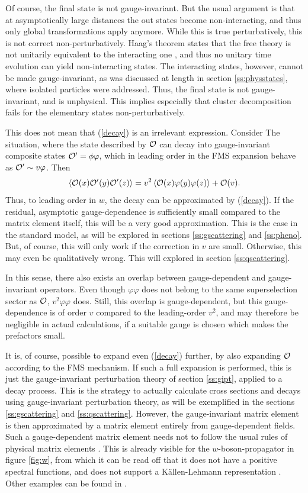 \documentclass[final,12pt]{article}
\newcommand*{\no}{\noindent}
\newcommand*{\be}{\begin{equation}}
\newcommand*{\ee}{\end{equation}}
\newcommand*{\pref}[1]{(\ref{#1})}
\newcommand*{\nn}{\nonumber}
\newcommand*{\1}{1\!\!\!\bot}
\newcommand*{\la}{\left\langle}
\newcommand*{\ra}{\right\rangle}
\newcommand*{\op}{{\cal O}}
\begin{document}
Of course, the final state is not gauge-invariant. But the usual argument is that at asymptotically large distances the out states become non-interacting, and thus only global transformations apply anymore. While this is true perturbatively, this is not correct non-perturbatively. Haag's theorem states that the free theory is not unitarily equivalent to the interacting one \cite{Haag:1992hx}, and thus no unitary time evolution can yield non-interacting states. The interacting states, however, cannot be made gauge-invariant, as was discussed at length in section \ref{ss:physstates}, where isolated particles were addressed. Thus, the final state is not gauge-invariant, and is unphysical. This implies especially that cluster decomposition fails for the elementary states non-perturbatively.

This does not mean that \pref{decay} is an irrelevant expression. Consider The situation, where the state described by $\op$ can decay into gauge-invariant composite states $\op'=\phi\varphi$, which in leading order in the FMS expansion behave as $\op'\sim v\varphi$. Then
\be
\la\op(x)\op'(y)\op'(z)\ra=v^2\la\op(x)\varphi(y)\varphi(z)\ra+\op(v)\nn.
\ee
\no Thus, to leading order in $w$, the decay can be approximated by \pref{decay}. If the residual, asymptotic gauge-dependence is sufficiently small compared to the matrix element itself, this will be a very good approximation. This is the case in the standard model, as will be explored in sections \ref{ss:gscattering} and \ref{ss:pheno}. But, of course, this will only work if the correction in $v$ are small. Otherwise, this may even be qualitatively wrong. This will explored in section \ref{ss:qscattering}.

In this sense, there also exists an overlap between gauge-dependent and gauge-invariant operators. Even though $\varphi\varphi$ does not belong to the same superselection sector as $\op$, $v^2\varphi\varphi$ does. Still, this overlap is gauge-dependent, but this gauge-dependence is of order $v$ compared to the leading-order $v^2$, and may therefore be negligible in actual calculations, if a suitable gauge is chosen which makes the prefactors small.

It is, of course, possible to expand even \pref{decay} further, by also expanding $\op$ according to the FMS mechanism. If such a full expansion is performed, this is just the gauge-invariant perturbation theory of section \ref{ss:gipt}, applied to a decay process. This is the strategy to actually calculate cross sections and decays using gauge-invariant perturbation theory, as will be exemplified in the sections \ref{ss:gscattering} and \ref{ss:qscattering}. However, the gauge-invariant matrix element is then approximated by a matrix element entirely from gauge-dependent fields. Such a gauge-dependent matrix element needs not to follow the usual rules of physical matrix elements \cite{Seiler:1982pw}. This is already visible for the $w$-boson-propagator in figure \ref{fig:w}, from which it can be read off that it does not have a positive spectral functions, and does not support a K\"allen-Lehmann representation \cite{Maas:2011se}. Other examples can be found in \cite{Raubitzek:unpublished}.
\end{document}
